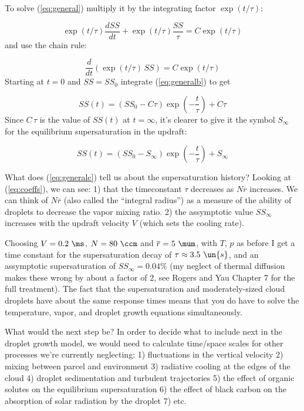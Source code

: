 \documentclass[12pt]{article}
\begin{document}
To solve (\ref{eq:general}) multiply it by the integrating factor $\exp(t/\tau)$:

\begin{equation}
  \label{eq:general2}
\exp(t/\tau)  \frac{d SS}{dt} + \exp(t/\tau) \frac{SS}{\tau} =   C \exp(t/\tau)
\end{equation}
and use the chain rule:

\begin{equation}
  \label{eq:generalb}
 \frac{d}{dt} \left ( \exp(t/\tau) \, SS \right ) =   C \exp(t/\tau)
\end{equation}
Starting at $t=0$ and $SS=SS_0$ integrate (\ref{eq:generalb}) to get

\begin{equation}
  \label{eq:generalc}
SS(t) = (SS_0 - C \tau) \exp \left (- \frac{t}{\tau} \right )  + C \tau
\end{equation}
Since $C\,\tau$ is the value of $SS(t)$ at $t=\infty$, it's clearer to
give it the symbol $S_\infty$ for the equilibrium supersaturation in the updraft:

\begin{equation}
  \label{eq:generald}
SS(t) = (SS_0 - S_{\infty}) \exp \left (- \frac{t}{\tau} \right )  + S_{\infty}
\end{equation}


What does (\ref{eq:generalc}) tell us about the supersaturation history? Looking at
(\ref{eq:coeffs}), we can see:  1) that the timeconstant $\tau$ decreases as
$N \overline{r}$ increases.  We can think of $N \overline{r}$ (also called the ``integral radius'')
as a measure of the ability of droplets to decrease the vapor mixing ratio.  2)
the assymptotic value $SS_\infty$ increases with the updraft velocity $V$ (which sets
the cooling rate).

Choosing $V=0.2\ \ms$, $N=80\ \ccm$ and $\overline{r}=5\ \mum$, with $T$, $p$ as before
I get a time constant for the supersaturation decay of $\tau \approx 3.5\ \un{s}$, and
an assymptotic supersaturation of $SS_\infty=0.04\%$ (my neglect of thermal diffusion
makes these wrong by about a factor of 2, see Rogers and Yau Chapter 7 for the full
treatment).  The fact that the supersaturation and moderately-sized cloud droplets have
about the same response times means that you do have to solve the temperature, vapor,
and droplet growth equations simultaneously.


What would the next step be?  In order to decide what to include next
in the droplet growth model, we would need to calculate time/space
scales for other processes we're currently neglecting:
1) fluctuations in the vertical velocity  2) mixing between parcel
and environment  3) radiative cooling at the edges of the cloud
4) droplet sedimentation and turbulent trajectories  5) the
effect of organic solutes on the equilibrium supersaturation
6) the effect of black carbon on the absorption of solar
radiation by the droplet 7) etc.
\end{document}
